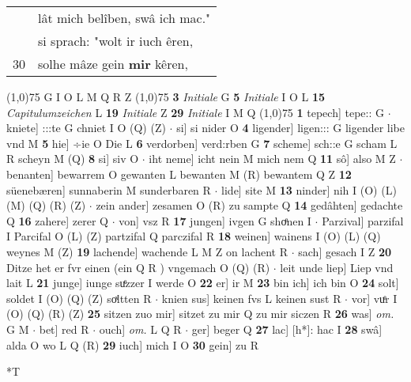 \documentclass[8pt,a4paper,notitlepage]{article}
\begin{document}
\begin{table}[ht]
\begin{minipage}[t]{0.5\linewidth}
\begin{tabular}{rl}
 & lât mich belîben, swâ ich mac."\\ 
 & si sprach: "wolt ir iuch êren,\\ 
30 & solhe mâze gein \textbf{mir} kêren,\\ 
\end{tabular}
\scriptsize
\line(1,0){75} \newline
G I O L M Q R Z \newline
\line(1,0){75} \newline
\textbf{3} \textit{Initiale} G  \textbf{5} \textit{Initiale} I O L  \textbf{15} \textit{Capitulumzeichen} L  \textbf{19} \textit{Initiale} Z  \textbf{29} \textit{Initiale} I M Q  \newline
\line(1,0){75} \newline
\textbf{1} tepech] tepe:: G  $\cdot$ kniete] :::te G chniet I O (Q) (Z)  $\cdot$ si] si nider O \textbf{4} ligender] ligen::: G ligender libe vnd M \textbf{5} hie] ÷ie O Die L \textbf{6} verdorben] verd:rben G \textbf{7} scheme] sch::e G scham L R scheyn M (Q) \textbf{8} si] siv O  $\cdot$ iht neme] icht nein M mich nem Q \textbf{11} sô] also M Z  $\cdot$ benanten] bewarrem O gewanten L bewanten M (R) bewantem Q Z \textbf{12} süenebæren] sunnaberin M sunderbaren R  $\cdot$ lide] site M \textbf{13} ninder] nih I (O) (L) (M) (Q) (R) (Z)  $\cdot$ zein ander] zesamen O (R) zu sampte Q \textbf{14} gedâhten] gedachte Q \textbf{16} zahere] zerer Q  $\cdot$ von] vsz R \textbf{17} jungen] ivgen G shoͤnen I  $\cdot$ Parzival] parzifal I Parcifal O (L) (Z) partzifal Q parczifal R \textbf{18} weinen] wainens I (O) (L) (Q) weynes M (Z) \textbf{19} lachende] wachende L M Z on lachent R  $\cdot$ sach] gesach I Z \textbf{20} Ditze het er fvr einen (ein Q R ) vngemach O (Q) (R)  $\cdot$ leit unde liep] Liep vnd lait L \textbf{21} junge] iunge suͤzzer I werde O \textbf{22} er] ir M \textbf{23} bin ich] ich bin O \textbf{24} solt] soldet I (O) (Q) (Z) soͯltten R  $\cdot$ knien sus] keinen fvs L keinen sust R  $\cdot$ vor] vuͤr I (O) (Q) (R) (Z) \textbf{25} sitzen zuo mir] sitzet zu mir Q zu mir siczen R \textbf{26} was] \textit{om.} G M  $\cdot$ bet] red R  $\cdot$ ouch] \textit{om.} L Q R  $\cdot$ ger] beger Q \textbf{27} lac] [h*]: hac I \textbf{28} swâ] alda O wo L Q (R) \textbf{29} iuch] mich I O \textbf{30} gein] zu R \newline
\end{minipage}
\hspace{0.5cm}
\begin{minipage}[t]{0.5\linewidth}
\small
\begin{center}*T

\end{center}
\end{minipage}
\end{table}
\end{document}
